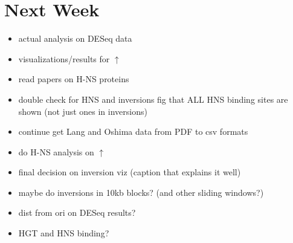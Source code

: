 \documentclass[12pt]{article}
\newcommand{\ecol}{\textit{E.\,coli}\xspace}
\begin{document}
\section*{Next Week}
\begin{itemize}
	\item actual analysis on DESeq data
	\item visualizations/results for $\uparrow$
	\item read papers on H-NS proteins
	\item double check for HNS and inversions fig that ALL HNS binding sites are shown (not just ones in inversions)
	\item continue get Lang and Oshima data from PDF to csv formats
	\item do H-NS analysis on $\uparrow$
	\item final decision on inversion viz (caption that explains it well)
	\item maybe do inversions in 10kb blocks? (and other sliding windows?)
	\item dist from ori on DESeq results?
	\item HGT and HNS binding?
\end{itemize}

\newpage

%
%
\end{document}
